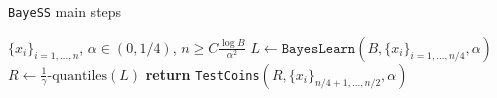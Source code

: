 \begin{algorithm}[t]
\caption{\texttt{BayeSS} main steps }\label{alg: bayeSS}
\begin{algorithmic}
 $\{x_i\}_{i=1,\dots, n}$, $\alpha \in (0,1/4)$, $n\geq C\frac{\log B}{\alpha^2}$
\STATE $L\gets \texttt{BayesLearn}(B, \{x_i\}_{i=1,\dots,n/4}, \alpha)$
\STATE $R \gets \frac{1}{\gamma}$-$\text{quantiles}(L)$ 
\STATE \textbf{return } \texttt{TestCoins}$(R, \{x_i\}_{n/4+1,\dots, n/2}, \alpha)$
\end{algorithmic}
\end{algorithm}